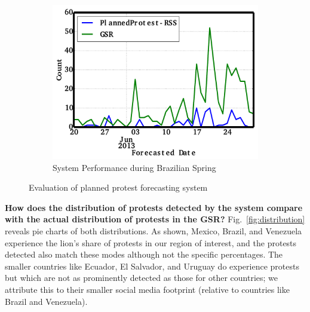 \documentclass[letterpaper]{article}
\begin{document}
\begin{figure}
\begin{subfigure}{.70\columnwidth}
  \includegraphics[scale=0.2]{brazil_june}
  \vspace{-0.5em}
  \caption{\scriptsize System Performance during Brazilian Spring}
  \label{fig:brazil_june}
\end{subfigure}\hspace{.5pt}
\caption{Evaluation of planned protest forecasting system}
\end{figure}



\noindent
{\bf How does the distribution of protests detected by the system compare with the
actual distribution of protests in the GSR?}
Fig.~\ref{fig:distribution} reveals pie charts of both distributions. As shown, Mexico, Brazil, and Venezuela
experience the lion's share of protests in our region of interest, and the protests detected also match these modes
although not the specific percentages. The smaller countries like Ecuador, El Salvador, and Uruguay do experience
protests but which are not as prominently detected as those for other countries; we attribute this to their smaller
social media footprint (relative to countries like Brazil and Venezuela).\\
\end{document}

